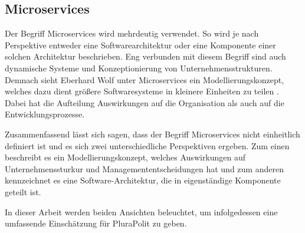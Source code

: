 \subsection{Microservices}


Der Begriff Microservices wird mehrdeutig verwendet. So wird je nach Perspektive entweder eine Softwarearchitektur oder eine Komponente einer solchen Architektur beschrieben. Eng verbunden mit diesem Begriff sind auch dynamische Systeme und Konzeptionierung von Unternehmensstrukturen. Demnach sieht Eberhard Wolf unter Microservices ein Modellierungskonzept, welches dazu dient größere Softwaresysteme in kleinere Einheiten zu teilen \parencite[vgl.][Kap. 1.1]{wolff_microservices_2018}. Dabei hat die Aufteilung Auswirkungen auf die Organisation als auch auf die Entwicklungsprozesse.

Zusammenfassend lässt sich sagen, dass der Begriff Microservices nicht einheitlich definiert ist und es sich zwei unterschiedliche Perspektiven ergeben. Zum einen beschreibt es ein Modellierungskonzept, welches Auswirkungen auf Unternehmenssturkur und Managemententscheidungen hat und zum anderen kennzeichnet es eine Software-Architektur, die in eigenständige Komponente geteilt ist.

In dieser Arbeit werden beiden Ansichten beleuchtet, um infolgedessen eine umfassende Einschätzung für PluraPolit zu geben.
